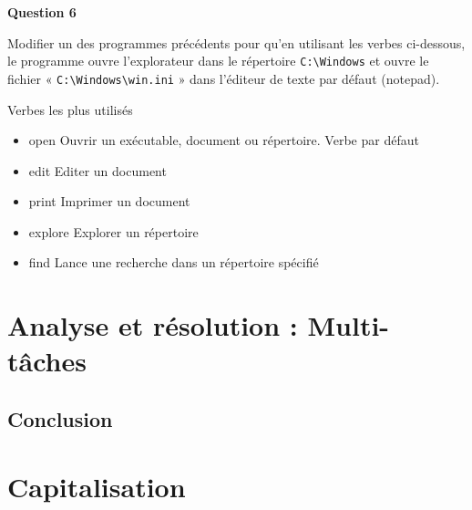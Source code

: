 \newpage

\noindent \textbf{Question 6}

\noindent Modifier un des programmes précédents pour qu'en utilisant les verbes ci-dessous, le programme ouvre l'explorateur dans le répertoire \texttt{C:\textbackslash Windows} et ouvre le fichier « \texttt{C:\textbackslash Windows\textbackslash win.ini} » dans l'éditeur de texte par défaut (notepad).

\noindent Verbes les plus utilisés
\begin{itemize}
	\item open Ouvrir un exécutable, document ou répertoire. Verbe par défaut
	\item edit Editer un document
	\item print Imprimer un document
	\item explore Explorer un répertoire
	\item find Lance une recherche dans un répertoire spécifié
\end{itemize}


\newpage

\section*{Analyse et résolution : Multi-tâches}


\subsection*{Conclusion}
{}

\newpage

\section*{Capitalisation}

